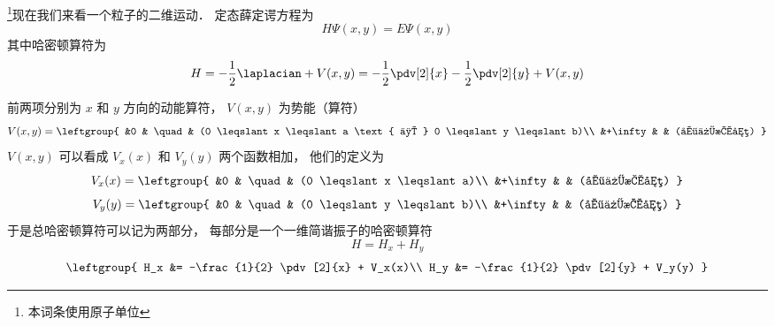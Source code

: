 

\footnote{本词条使用原子单位}现在我们来看一个粒子的二维运动． 定态薛定谔方程为
\begin{equation}\label{ISW2D_eq1}
H \Psi(x, y) = E \Psi(x, y)
\end{equation}
其中哈密顿算符为
\begin{equation}
H = -\frac{1}{2} \laplacian + V(x, y) =  -\frac{1}{2} \pdv[2]{x} -\frac{1}{2} \pdv[2]{y}  + V(x, y)
\end{equation}

前两项分别为 $x$ 和 $y$ 方向的动能算符， $V(x, y)$ 为势能（算符）
\begin{equation}
V(x, y) = \leftgroup{
    &0 & \quad & (0 \leqslant x \leqslant a \text{ 且 } 0 \leqslant y \leqslant b)\\
    &+\infty & & (其他情况)
}
\end{equation}
$V(x, y)$ 可以看成 $V_x(x)$ 和 $V_y(y)$ 两个函数相加， 他们的定义为
\begin{equation}
V_x(x) = \leftgroup{
    &0 & \quad & (0 \leqslant x \leqslant a)\\
    &+\infty & & (其他情况)
}
\end{equation}
\begin{equation}
V_y(y) = \leftgroup{
    &0 & \quad & (0 \leqslant y \leqslant b)\\
    &+\infty & & (其他情况)
}
\end{equation}
于是总哈密顿算符可以记为两部分， 每部分是一个一维简谐振子的哈密顿算符
\begin{equation}
H = H_x + H_y
\end{equation}
\begin{equation}
\leftgroup{
H_x &= -\frac{1}{2} \pdv[2]{x} + V_x(x)\\
H_y &= -\frac{1}{2} \pdv[2]{y} + V_y(y)
}
\end{equation}


